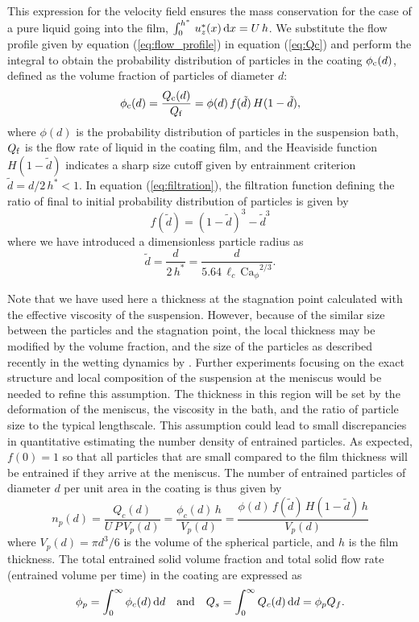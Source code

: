 \documentclass{jfm}
\begin{document}
This expression for the velocity field ensures the mass conservation for the case of a pure liquid going into the film, $\int_{0}^{h^{*}}\, u_{z}^{*}(x) \,{\rm d} x=U \,h$. We substitute the flow profile given by equation (\ref{eq:flow_profile}) in equation (\ref{eq:Qc}) and perform the integral to obtain the probability distribution of particles in the coating $\phi_{\rm c}(d)$, defined as the volume fraction of particles of diameter $d$:
\begin{equation} \label{eq:filtration}
\phi_{\rm c}(d)=\frac{Q_{\rm c}(d)}{Q_{\rm f}}=\phi(d)\, f(\tilde{d}) \,H(1- \tilde{d}),
\end{equation}
where $\phi(d)$ is the probability distribution of particles in the suspension bath, $Q_{\rm f}$ is the flow rate of liquid in the coating film, and the Heaviside function $H(1- \tilde{d})$ indicates a sharp size cutoff given by entrainment criterion $\tilde{d}={d}/{2\,h^{*}}<1$. In equation (\ref{eq:filtration}), the filtration function defining the ratio of final to initial probability distribution of particles is given by
\begin{equation}
f(\tilde{d})=(1-\tilde{d})^{3}-\tilde{d}^{3}
\end{equation}
where we have introduced a dimensionless particle radius as
\begin{equation}
\tilde{d}=\frac{d}{2\,h^{*}}=\frac{d}{5.64\, \ell_c\, {\mathrm{Ca}_\phi}^{2 / 3}}.
\end{equation}

Note that we have used here a thickness at the stagnation point calculated with the effective viscosity of the suspension. However, because of the similar size between the particles and the stagnation point, the local thickness may be modified by the volume fraction, and the size of the particles as described recently in the wetting dynamics by \cite{zhao2020spreading}. Further experiments focusing on the exact structure and local composition of the suspension at the meniscus would be needed to refine this assumption. The thickness in this region will be set by the deformation of the meniscus, the viscosity in the bath, and the ratio of particle size to the typical lengthscale. This assumption could lead to small discrepancies in quantitative estimating the number density of entrained particles. As expected, $f(0)=1$ so that all particles that are small compared to the film thickness will be entrained if they arrive at the meniscus. The number of entrained particles of diameter $d$ per unit area in the coating is thus given by
\begin{equation}
n_{p}(d)=\frac{Q_{c}(d)}{U\,P\,V_{p}(d)}=\frac{\phi_{c}(d) \,h}{V_{p}(d)}=\frac{\phi(d)\, f(\tilde{d}) \,H(1- \tilde{d})\,h}{V_{p}(d)}
\end{equation}
where $V_{p}(d)=\pi d^{3}/6$ is the volume of the spherical particle, and $h$ is the film thickness. The total entrained solid volume fraction and total solid flow rate (entrained volume per time) in the coating are expressed as
\begin{equation}
    \phi_{p}=\int_{0}^{\infty} \phi_{c}(d) \,{\rm  d} d \quad {\rm and} \quad Q_{s}=\int_{0}^{\infty} Q_{c}(d)\,{\rm  d} d=\phi_{p} Q_{f}.
\end{equation}
\end{document}
